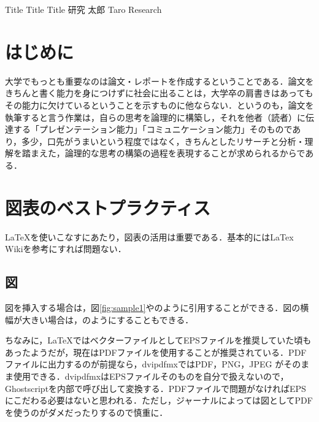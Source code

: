 \documentclass[a4paper,10pt,twocolumn,uplatex]{jsarticle}
\date{1}
\begin{document}
{Title Title Title}
{研究 太郎}
{Taro Research}

\section{はじめに}
大学でもっとも重要なのは論文・レポートを作成するということである．論文をきちんと書く能力を身につけずに社会に出ることは，大学卒の肩書きはあってもその能力に欠けているということを示すものに他ならない．というのも，論文を執筆すると言う作業は，自らの思考を論理的に構築し，それを他者（読者）に伝達する「プレゼンテーション能力」「コミュニケーション能力」そのものであり，多少，口先がうまいという程度ではなく，きちんとしたリサーチと分析・理解を踏まえた，論理的な思考の構築の過程を表現することが求められるからである．

\section{図表のベストプラクティス}
\LaTeX{}を使いこなすにあたり，図表の活用は重要である．基本的にはLaTex Wiki\cite{latex_wiki}を参考にすれば問題ない．\par

\subsection{図}
図を挿入する場合は，図\ref{fig:sample1}やのように引用することができる．図の横幅が大きい場合は，のようにすることもできる．\par
ちなみに，\LaTeX{}ではベクターファイルとしてEPSファイルを推奨していた頃もあったようだが，現在はPDFファイルを使用することが推奨されている．PDFファイルに出力するのが前提なら，dvipdfmxではPDF，PNG，JPEG がそのまま使用できる．dvipdfmxはEPSファイルそのものを自分で扱えないので，Ghostscriptを内部で呼び出して変換する．PDFファイルで問題がなければEPSにこだわる必要はないと思われる．ただし，ジャーナルによっては図としてPDFを使うのがダメだったりするので慎重に．
\end{document}
